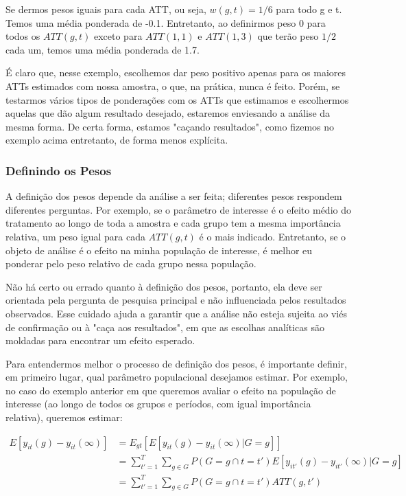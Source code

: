 \documentclass[portugues]{article}
\begin{document}
Se dermos pesos iguais para cada ATT, ou seja, $w(g,t)=1/6$ para todo g e t. Temos uma média ponderada de -0.1. Entretanto, ao definirmos peso 0 para todos os $ATT(g,t)$ exceto para $ATT(1,1)$ e $ATT(1,3)$ que terão peso $1/2$ cada um, temos uma média ponderada de 1.7.

É claro que, nesse exemplo, escolhemos dar peso positivo apenas para os maiores ATTs estimados com nossa amostra, o que, na prática, nunca é feito. Porém, se testarmos vários tipos de ponderações com os ATTs que estimamos e escolhermos aquelas que dão algum resultado desejado, estaremos enviesando a análise da mesma forma. De certa forma, estamos "caçando resultados", como fizemos no exemplo acima entretanto, de forma menos explícita. %

\subsubsection{Definindo os Pesos} \label{sec:definindoPesos}

A definição dos pesos depende da análise a ser feita; diferentes pesos respondem diferentes perguntas. Por exemplo, se o parâmetro de interesse é o efeito médio do tratamento ao longo de toda a amostra e cada grupo tem a mesma importância relativa, um peso igual para cada $ATT(g,t)$ é o mais indicado. Entretanto, se o objeto de análise é o efeito na minha população de interesse, é melhor eu ponderar pelo peso relativo de cada grupo nessa população. 

Não há certo ou errado quanto à definição dos pesos, portanto, ela deve ser orientada pela pergunta de pesquisa principal e não influenciada pelos resultados observados. Esse cuidado ajuda a garantir que a análise não esteja sujeita ao viés de confirmação ou à "caça aos resultados", em que as escolhas analíticas são moldadas para encontrar um efeito esperado.

Para entendermos melhor o processo de definição dos pesos, é importante definir, em primeiro lugar, qual parâmetro populacional desejamos estimar. Por exemplo, no caso do exemplo anterior em que queremos avaliar o efeito na população de interesse (ao longo de todos os grupos e períodos, com igual importância relativa), queremos estimar:

\[
\begin{split}
    E[y_{it}(g) - y_{it}(\infty)] &= E_{gt}[E[y_{it}(g) - y_{it}(\infty)|G=g]] \\
    &= \sum_{t'=1}^{T} \sum_{g \in G} P(G=g \cap t=t') E[y_{it'}(g) - y_{it'}(\infty)|G=g] \\
    &= \sum_{t'=1}^{T} \sum_{g \in G} P(G=g \cap t=t') ATT(g,t')
\end{split}
\]
\end{document}
